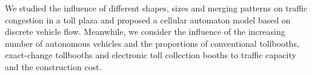 \documentclass{mcmthesis}
\begin{document}
	We studied the influence of different shapes, sizes and merging patterns on traffic congestion in a toll plaza and proposed a cellular automaton model based on discrete vehicle flow. Meanwhile, we consider the influence of the increasing number of autonomous vehicles and the proportions of conventional tollbooths, exact-change tollbooths and electronic toll collection booths to traffic capacity and the construction cost.
	






\end{document}
